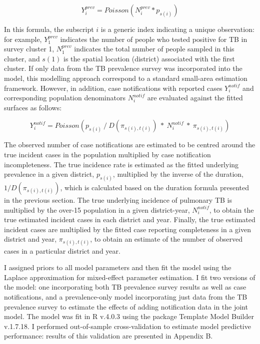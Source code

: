 \documentclass[
]{report}
\begin{document}
\[Y^{prev}_i = Poisson(N^{prev}_i * p_{s(i)})\]

In this formula, the subscript \(i\) is a generic index indicating a unique observation: for example, \(Y^{prev}_1\) indicates the number of people who tested positive for TB in survey cluster 1, \(N^{prev}_1\) indicates the total number of people sampled in this cluster, and \(s(1)\) is the spatial location (district) associated with the first cluster. If only data from the TB prevalence survey was incorporated into the model, this modelling approach correspond to a standard small-area estimation framework. However, in addition, case notifications with reported cases \(Y^{notif}_i\) and corresponding population denominators \(N^{notif}_i\) are evaluated against the fitted surfaces as follows:

\[Y^{notif}_i = Poisson(p_{s(i)} ~/~ D(\pi_{s(i),t(i)}) ~*~ N^{notif}_i ~*~ \pi_{s(i),t(i)})\]

The observed number of case notifications are estimated to be centred around the true incident cases in the population multiplied by case notification incompleteness. The true incidence rate is estimated as the fitted underlying prevalence in a given district, \(p_{s(i)}\), multiplied by the inverse of the duration, \(1/D(\pi_{s(i),t(i)})\), which is calculated based on the duration formula presented in the previous section. The true underlying incidence of pulmonary TB is multiplied by the over-15 population in a given district-year, \(N^{notif}_i\), to obtain the true estimated incident cases in each district and year. Finally, the true estimated incident cases are multiplied by the fitted case reporting completeness in a given district and year, \(\pi_{s(i),t(i)}\), to obtain an estimate of the number of observed cases in a particular district and year.

I assigned priors to all model parameters and then fit the model using the Laplace approximation for mixed-effect parameter estimation.\autocite{Kristensen2016,Thorson2016} I fit two versions of the model: one incorporating both TB prevalence survey results as well as case notifications, and a prevalence-only model incorporating just data from the TB prevalence survey to estimate the effects of adding notification data in the joint model. The model was fit in R v.4.0.3 using the package Template Model Builder v.1.7.18.\autocite{Kristensen2016,RCoreTeam2018} I performed out-of-sample cross-validation to estimate model predictive performance: results of this validation are presented in Appendix B.
\end{document}
